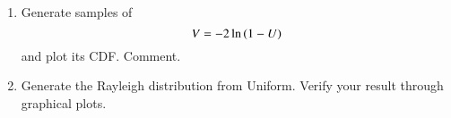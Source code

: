 \begin{enumerate}[label=\thesection.\arabic*.,ref=\thesection.\theenumi]
%
%
\item
Generate samples of 
%
\begin{equation}
V = -2\ln\left(1-U\right)
\label{eq:probman_V_cdf_sim}
\end{equation}
%
and plot its CDF.  Comment.
\\
\solution


%
\item
Generate the Rayleigh distribution from Uniform. Verify your result through graphical plots.

\end{enumerate}
